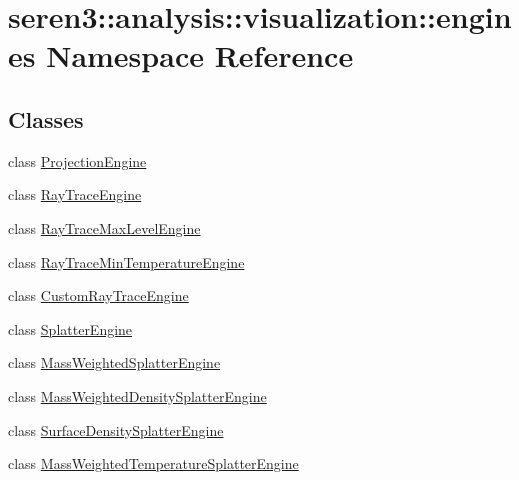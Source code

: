\hypertarget{namespaceseren3_1_1analysis_1_1visualization_1_1engines}{
\section{seren3::analysis::visualization::engines Namespace Reference}
\label{namespaceseren3_1_1analysis_1_1visualization_1_1engines}
}
\subsection*{Classes}
\begin{DoxyCompactItemize}
\item 
class \hyperlink{classseren3_1_1analysis_1_1visualization_1_1engines_1_1ProjectionEngine}{ProjectionEngine}
\item 
class \hyperlink{classseren3_1_1analysis_1_1visualization_1_1engines_1_1RayTraceEngine}{RayTraceEngine}
\item 
class \hyperlink{classseren3_1_1analysis_1_1visualization_1_1engines_1_1RayTraceMaxLevelEngine}{RayTraceMaxLevelEngine}
\item 
class \hyperlink{classseren3_1_1analysis_1_1visualization_1_1engines_1_1RayTraceMinTemperatureEngine}{RayTraceMinTemperatureEngine}
\item 
class \hyperlink{classseren3_1_1analysis_1_1visualization_1_1engines_1_1CustomRayTraceEngine}{CustomRayTraceEngine}
\item 
class \hyperlink{classseren3_1_1analysis_1_1visualization_1_1engines_1_1SplatterEngine}{SplatterEngine}
\item 
class \hyperlink{classseren3_1_1analysis_1_1visualization_1_1engines_1_1MassWeightedSplatterEngine}{MassWeightedSplatterEngine}
\item 
class \hyperlink{classseren3_1_1analysis_1_1visualization_1_1engines_1_1MassWeightedDensitySplatterEngine}{MassWeightedDensitySplatterEngine}
\item 
class \hyperlink{classseren3_1_1analysis_1_1visualization_1_1engines_1_1SurfaceDensitySplatterEngine}{SurfaceDensitySplatterEngine}
\item 
class \hyperlink{classseren3_1_1analysis_1_1visualization_1_1engines_1_1MassWeightedTemperatureSplatterEngine}{MassWeightedTemperatureSplatterEngine}
\end{DoxyCompactItemize}


